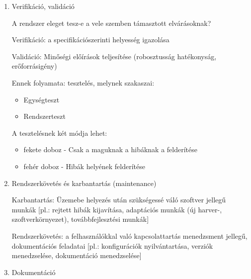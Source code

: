 \documentclass[margin=0px]{article}
\begin{document}
\begin{enumerate}
			\item Verifikáció, validáció
			
			A rendszer eleget tesz-e a vele szemben támasztott elvárásoknak?
			
			Verifikáció: a specifikációszerinti helyesség igazolása
			
			Validáció: Minőségi előírások teljesítése (robosztusság hatékonyság, erőforrásigény)
			
			Ennek folyamata: tesztelés, melynek szakaszai:
			\begin{itemize}
				\item Egységteszt
				\item Rendszerteszt 
			\end{itemize}
			A tesztelésnek két módja lehet:
			\begin{itemize}
				\item fekete doboz - Csak a maguknak a hibáknak a felderítése
				\item fehér doboz - Hibák helyének felderítése 
			\end{itemize}
			
			\item Rendszerkövetés és karbantartás (maintenance)
			
			Karbantartás: Üzemebe helyezés után szükségessé váló szoftver jellegű munkák [pl.: rejtett hibák kijavítása, adaptációs munkák (új harver-, szoftverkörnyezet), továbbfejlesztési munkák]
			
			Rendszerkövetés: a felhasználókkal való kapcsolattartás menedzsment jellegű, dokumentációs feladatai [pl.: konfigurációk nyilvántartása, verziók menedzselése, dokumentáció menedzselése]
			
			\item Dokumentáció
			

\end{enumerate}
\end{document}
